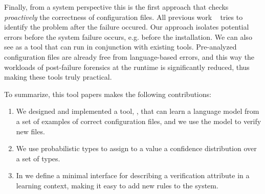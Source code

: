 Finally, from a system perspective this is the first approach that checks 
{\emph{proactively}} the correctness of configuration files. All previous work
~\cite{xu15systems,zhang14encore,yuan11context, wang04automatic,attariyan10automating,
su07autobash,whitaker04configuration} tries to identify the problem after the
failure occured. Our approach isolates potential errors before the system failure occurs, e.g. before the installation. We can also see \app as a tool that can run in conjunction with existing tools. Pre-analyzed configuration files are already free from language-based errors, and this way the workloads of post-failure forensics at the runtime
is significantly reduced, thus making these tools truly practical.

To summarize, this tool papers makes the following contributions:

\begin{enumerate}

  \item We designed and implemented a tool, \app, that can learn a language model from a set of examples of correct configuration files, and we use the model to verify new files.
  \item We use probabilistic types to assign to a value a confidence distribution over a set of types.
  \item In \app we define a minimal interface for describing a verification attribute in a learning context, making it easy to add new rules to the system.

\end{enumerate}
